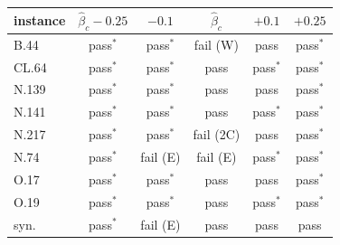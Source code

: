 \begin{tabular}{lccccc}
\toprule
instance & $\hat\beta_c-0.25$ & $-0.1$ & $\hat\beta_c$ & $+0.1$ & $+0.25$ \\
\midrule
B.44 & pass$^\ast$ & pass$^\ast$ & fail (W) & pass & pass$^\ast$ \\
CL.64 & pass$^\ast$ & pass$^\ast$ & pass & pass$^\ast$ & pass$^\ast$ \\
N.139 & pass$^\ast$ & pass$^\ast$ & pass & pass & pass$^\ast$ \\
N.141 & pass$^\ast$ & pass$^\ast$ & pass & pass$^\ast$ & pass$^\ast$ \\
N.217 & pass$^\ast$ & pass$^\ast$ & fail (2C) & pass & pass$^\ast$ \\
N.74 & pass$^\ast$ & fail (E) & fail (E) & pass$^\ast$ & pass$^\ast$ \\
O.17 & pass$^\ast$ & pass$^\ast$ & pass & pass & pass$^\ast$ \\
O.19 & pass$^\ast$ & pass$^\ast$ & pass & pass$^\ast$ & pass$^\ast$ \\
syn. & pass$^\ast$ & fail (E) & pass & pass & pass \\
\bottomrule
\end{tabular}
